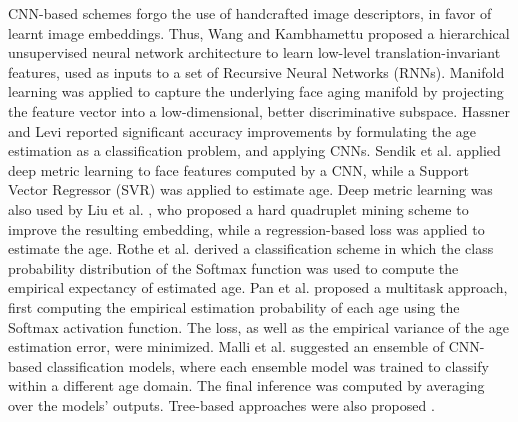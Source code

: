 \documentclass[10pt,journal]{IEEEtran}\usepackage{amsfonts}
\begin{document}
CNN-based schemes forgo the use of handcrafted image descriptors, in favor of
learnt image embeddings. Thus, Wang and Kambhamettu \cite{wang2015age}
proposed a hierarchical unsupervised neural network architecture to learn
low-level translation-invariant features, used as inputs to a set of Recursive
Neural Networks (RNNs). Manifold learning was applied to capture the
underlying face aging manifold by projecting the feature vector into a
low-dimensional, better discriminative subspace. Hassner and Levi
\cite{leviage} reported significant accuracy improvements by formulating the
age estimation as a classification problem, and applying CNNs. Sendik et al.
\cite{deepage} applied deep metric learning to face features computed by a
CNN, while a Support Vector Regressor (SVR) was applied to estimate age. Deep
metric learning was also used by Liu et al. \cite{8017500}, who proposed a
hard quadruplet mining scheme to improve the resulting embedding, while a
regression-based loss was applied to estimate the age. Rothe et al.
\cite{7406390} derived a classification scheme in which the class probability
distribution of the Softmax function was used to compute the empirical
expectancy of estimated age. Pan et al. \cite{Mean-Variance} proposed a
multitask approach, first computing the empirical estimation probability of
each age using the Softmax activation function. The  loss, as well as
the empirical variance of the age estimation error, were minimized. Malli et
al. \cite{Malli_2016} suggested an ensemble of CNN-based classification
models, where each ensemble model was trained to classify within a different
age domain. The final inference was computed by averaging over the models'
outputs. Tree-based approaches were also proposed \cite{8954134, 8578343}.
\end{document}

